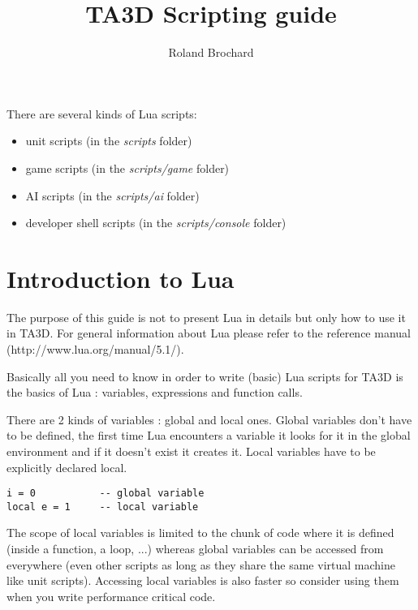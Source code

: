\documentclass[a4paper,10pt]{article}
\title{TA3D Scripting guide}
\author{Roland Brochard}
\begin{document}
\maketitle


\pagebreak

There are several kinds of Lua scripts:
\begin{itemize}
 \item unit scripts (in the \textit{scripts} folder)
 \item game scripts (in the \textit{scripts/game} folder)
 \item AI scripts (in the \textit{scripts/ai} folder)
 \item developer shell scripts (in the \textit{scripts/console} folder)
\end{itemize}

\section{Introduction to Lua}

The purpose of this guide is not to present Lua in details but only how to use it in TA3D. For general information about Lua please refer to the reference manual (http://www.lua.org/manual/5.1/).

Basically all you need to know in order to write (basic) Lua scripts for TA3D is the basics of Lua : variables, expressions and function calls.

There are 2 kinds of variables : global and local ones. Global variables don't have to be defined, the first time Lua encounters a variable it looks for it in the global environment and if it doesn't exist it creates it. Local variables have to be explicitly declared local.

\begin{lstlisting}
i = 0           -- global variable
local e = 1     -- local variable
\end{lstlisting}

The scope of local variables is limited to the chunk of code where it is defined (inside a function, a loop, ...) whereas global variables can be accessed from everywhere (even other scripts as long as they share the same virtual machine like unit scripts). Accessing local variables is also faster so consider using them when you write performance critical code.
\end{document}
